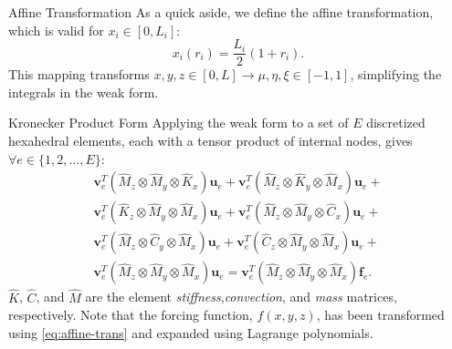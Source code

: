 \begin{frame}{Affine Transformation}
  As a quick aside, we define the affine transformation, which is valid for $x_i\in [0,L_i]$:
  \begin{equation}
    \label{eq:affine-trans}
    x_i (r_i)=\frac{L_i}{2}\left(1+r_i\right).
  \end{equation}
  This mapping transforms $x,y,z\in [0,L] \rightarrow \mu,\eta,\xi\in [-1,1]$, simplifying the integrals in the weak form.
\end{frame}

\begin{frame}{Kronecker Product Form}
  Applying the weak form to a set of $E$ discretized hexahedral elements, each with a tensor product of internal nodes, gives $\forall e\in \{1,2,\dots ,E\}$:
  \begin{multline}
    \label{eq:kronecker-product-form}
    \mathbf{v}^T_e\left(\hat{M}_z\otimes \hat{M}_y\otimes \hat{K}_x\right)\mathbf{u}_e+
    \mathbf{v}^T_e\left(\hat{M}_z\otimes \hat{K}_y\otimes \hat{M}_x\right)\mathbf{u}_e+\\
    \mathbf{v}^T_e\left(\hat{K}_z\otimes \hat{M}_y\otimes \hat{M}_x\right)\mathbf{u}_e+
    \mathbf{v}^T_e\left(\hat{M}_z\otimes \hat{M}_y\otimes \hat{C}_x\right)\mathbf{u}_e+\\
    \mathbf{v}^T_e\left(\hat{M}_z\otimes \hat{C}_y\otimes \hat{M}_x\right)\mathbf{u}_e+
    \mathbf{v}^T_e\left(\hat{C}_z\otimes \hat{M}_y\otimes \hat{M}_x\right)\mathbf{u}_e+\\
    \mathbf{v}^T_e\left(\hat{M}_z\otimes\hat{M}_y\otimes\hat{M}_x\right)\mathbf{u}_e=
    \mathbf{v}^T_e\left(\hat{M}_z\otimes\hat{M}_y\otimes\hat{M}_x\right)\mathbf{f}_e.
  \end{multline}
  $\hat{K}$, $\hat{C}$, and $\hat{M}$ are the element \textit{stiffness},\textit{convection}, and \textit{mass} matrices, respectively.
  Note that the forcing function, $f(x,y,z)$, has been transformed using \cref{eq:affine-trans} and expanded using Lagrange polynomials.
\end{frame}

